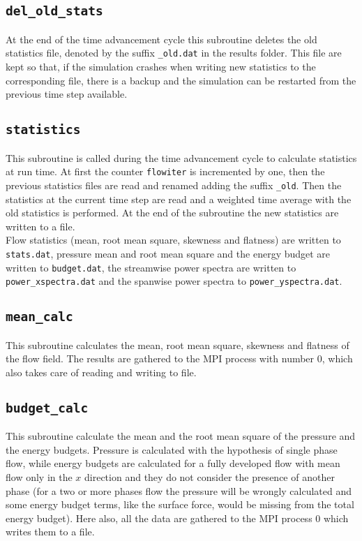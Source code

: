 \subsection{\texttt{del\_old\_stats}}
At the end of the time advancement cycle this subroutine deletes the old statistics file, denoted by the suffix \texttt{\_old.dat} in the results folder. This file are kept so that, if the simulation crashes when writing new statistics to the corresponding file, there is a backup and the simulation can be restarted from the previous time step available.

\subsection{\texttt{statistics}}
This subroutine is called during the time advancement cycle to calculate statistics at run time. At first the counter \texttt{flowiter} is incremented by one, then the previous statistics files are read and renamed adding the suffix \texttt{\_old}. Then the statistics at the current time step are read and a weighted time average with the old statistics is performed. At the end of the subroutine the new statistics are written to a file.\\
Flow statistics (mean, root mean square, skewness and flatness) are written to \texttt{stats.dat}, pressure mean and root mean square and the energy budget are written to \texttt{budget.dat}, the streamwise power spectra are written to \texttt{power\_xspectra.dat} and the spanwise power spectra to \texttt{power\_yspectra.dat}.

\subsection{\texttt{mean\_calc}}
This subroutine calculates the mean, root mean square, skewness and flatness of the flow field. The results are gathered to the MPI process with number 0, which also takes care of reading and writing to file.

\subsection{\texttt{budget\_calc}}
This subroutine calculate the mean and the root mean square of the pressure and the energy budgets. Pressure is calculated with the hypothesis of single phase flow, while energy budgets are calculated for a fully developed flow with mean flow only in the $x$ direction and they do not consider the presence of another phase (for a two or more phases flow the pressure will be wrongly calculated and some energy budget terms, like the surface force, would be missing from the total energy budget). Here also, all the data are gathered to the MPI process 0 which writes them to a file.

